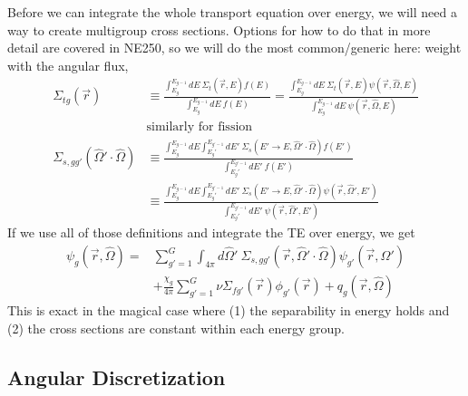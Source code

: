 \documentclass[12pt]{article}
\newcommand{\rvec}{\ensuremath{\vec{r}}}
\newcommand{\vOmega}{\ensuremath{\hat{\Omega}}}
\begin{document}
Before we can integrate the whole transport equation over energy, we will need a way to create multigroup cross sections. Options for how to do that in more detail are covered in NE250, so we will do the most common/generic here: weight with the angular flux,
\begin{align*}
\Sigma_{tg}(\vec{r}) &\equiv \frac{\int_{E_g}^{E_{g-1}} dE\: \Sigma_t(\rvec, E) f(E)}{\int_{E_g}^{E_{g-1}} dE\: f(E)} = \frac{\int_{E_g}^{E_{g-1}} dE\: \Sigma_t(\rvec, E) \psi(\rvec, \vOmega, E)}{\int_{E_g}^{E_{g-1}} dE\: \psi(\rvec, \vOmega, E)} \\
&\text{similarly for fission}\\
\Sigma_{s,gg'}(\vOmega' \cdot \vOmega) & \equiv \frac{\int_{E_g}^{E_{g-1}} dE \int_{E_g'}^{E_{g'-1}} dE' \: \Sigma_s(E'\rightarrow E, \vOmega' \cdot \vOmega) f(E')}{\int_{E_g'}^{E_{g'-1}} dE' \: f(E')}\\
& \equiv \frac{\int_{E_g}^{E_{g-1}} dE \int_{E_g'}^{E_{g'-1}} dE' \: \Sigma_s(E'\rightarrow E, \vOmega' \cdot \vOmega) \psi(\rvec, \vOmega', E')}{\int_{E_g'}^{E_{g'-1}} dE' \: \psi(\rvec, \vOmega', E')}
\end{align*}
%
If we use all of those definitions and integrate the TE over energy, we get
\begin{align*}
[\vOmega \cdot \nabla + \Sigma_{tg}(\vec{r})]\psi_g(\vec{r}, \vOmega) =&  
\sum_{g'=1}^G \int_{4 \pi} d\vOmega'\: \Sigma_{s,gg'}(\vec{r}, \vOmega' \cdot \vOmega) \psi_{g'}(\vec{r}, \vOmega')\\
&+\frac{\chi_g}{4 \pi}\sum_{g'=1}^G \nu\Sigma_{fg'}(\vec{r}) \phi_{g'}(\vec{r}) + q_g(\vec{r}, \vOmega)
\end{align*}
This is exact in the magical case where (1) the separability in energy holds and (2) the cross sections are constant within each energy group. 


\subsection*{Angular Discretization}
\end{document}
